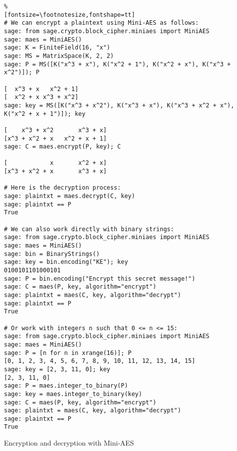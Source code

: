 \begin{sagecode}
\begin{Verbatim}%
[fontsize=\footnotesize,fontshape=tt]
# We can encrypt a plaintext using Mini-AES as follows:
sage: from sage.crypto.block_cipher.miniaes import MiniAES
sage: maes = MiniAES()
sage: K = FiniteField(16, "x")
sage: MS = MatrixSpace(K, 2, 2)
sage: P = MS([K("x^3 + x"), K("x^2 + 1"), K("x^2 + x"), K("x^3 + x^2")]); P

[  x^3 + x   x^2 + 1]
[  x^2 + x x^3 + x^2]
sage: key = MS([K("x^3 + x^2"), K("x^3 + x"), K("x^3 + x^2 + x"), K("x^2 + x + 1")]); key

[    x^3 + x^2       x^3 + x]
[x^3 + x^2 + x   x^2 + x + 1]
sage: C = maes.encrypt(P, key); C

[            x       x^2 + x]
[x^3 + x^2 + x       x^3 + x]

# Here is the decryption process:
sage: plaintxt = maes.decrypt(C, key)
sage: plaintxt == P
True

# We can also work directly with binary strings:
sage: from sage.crypto.block_cipher.miniaes import MiniAES
sage: maes = MiniAES()
sage: bin = BinaryStrings()
sage: key = bin.encoding("KE"); key
0100101101000101
sage: P = bin.encoding("Encrypt this secret message!")
sage: C = maes(P, key, algorithm="encrypt")
sage: plaintxt = maes(C, key, algorithm="decrypt")
sage: plaintxt == P
True

# Or work with integers n such that 0 <= n <= 15:
sage: from sage.crypto.block_cipher.miniaes import MiniAES
sage: maes = MiniAES()
sage: P = [n for n in xrange(16)]; P
[0, 1, 2, 3, 4, 5, 6, 7, 8, 9, 10, 11, 12, 13, 14, 15]
sage: key = [2, 3, 11, 0]; key
[2, 3, 11, 0]
sage: P = maes.integer_to_binary(P)
sage: key = maes.integer_to_binary(key)
sage: C = maes(P, key, algorithm="encrypt")
sage: plaintxt = maes(C, key, algorithm="decrypt")
sage: plaintxt == P
True
\end{Verbatim}
\caption{Encryption and decryption with Mini-AES}
\end{sagecode}






